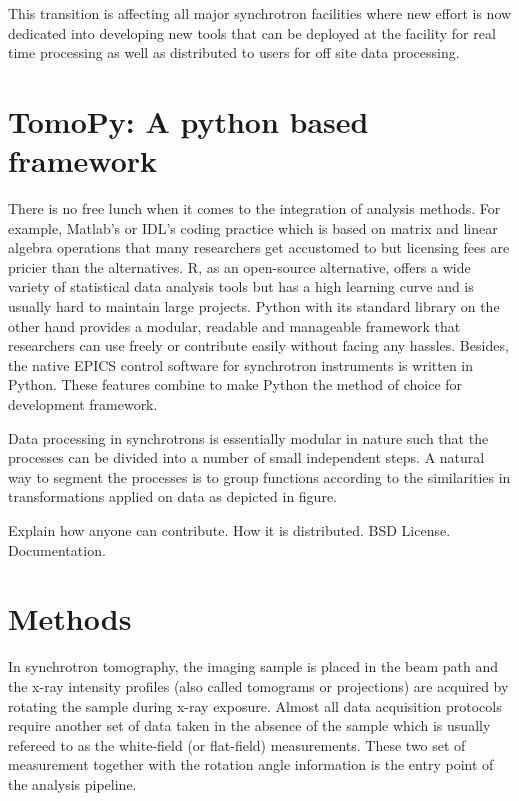 \documentclass[pdf]{iucr}              %
\begin{document}
This transition is affecting all major synchrotron facilities where new effort is now dedicated into developing new tools that can be deployed at the facility for real time processing as well as distributed to users for off site data processing.


\section{TomoPy: A python based framework}

There is no free lunch when it comes to the integration of analysis methods. For example, Matlab's or IDL's coding practice which is based on matrix and linear algebra operations that many researchers get accustomed to but licensing fees are pricier than the alternatives. R, as an open-source alternative, offers a wide variety of statistical data analysis tools but has a high learning curve and is usually hard to maintain large projects. Python with its standard library on the other hand provides a modular, readable and manageable framework that researchers can use freely or contribute easily without facing any hassles. Besides, the native EPICS control software for synchrotron instruments is written in Python. These features combine to make Python the method of choice for development framework.

Data processing in synchrotrons is essentially modular in nature such that the processes can be divided into a number of small independent steps. A natural way to segment the processes is to group functions according to the similarities in transformations applied on data as depicted in figure. 

Explain how anyone can contribute. How it is distributed. BSD License. Documentation.

\section{Methods} 

In synchrotron tomography, the imaging sample is placed in the beam path and the x-ray intensity profiles (also called tomograms or projections) are acquired by rotating the sample during x-ray exposure. Almost all data acquisition protocols require another set of data taken in the absence of the sample which is usually refereed to as the white-field (or flat-field) measurements. These two set of measurement together with the rotation angle information is the entry point of the analysis pipeline.
\end{document}
